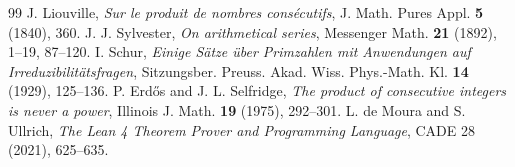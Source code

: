 \documentclass[11pt,a4paper]{article}
\theoremstyle{definition}
\begin{document}
\begin{thebibliography}{99}
 J. Liouville, \textit{Sur le produit de nombres cons\'ecutifs}, J. Math. Pures Appl. \textbf{5} (1840), 360.
 J. J. Sylvester, \textit{On arithmetical series}, Messenger Math. \textbf{21} (1892), 1--19, 87--120.
 I. Schur, \textit{Einige S\"atze \"uber Primzahlen mit Anwendungen auf Irreduzibilit\"atsfragen}, Sitzungsber. Preuss. Akad. Wiss. Phys.-Math. Kl. \textbf{14} (1929), 125--136.
 P. Erd\H{o}s and J. L. Selfridge, \textit{The product of consecutive integers is never a power}, Illinois J. Math. \textbf{19} (1975), 292--301.
 L. de Moura and S. Ullrich, \textit{The Lean 4 Theorem Prover and Programming Language}, CADE 28 (2021), 625--635.
\end{thebibliography}
\end{document}
